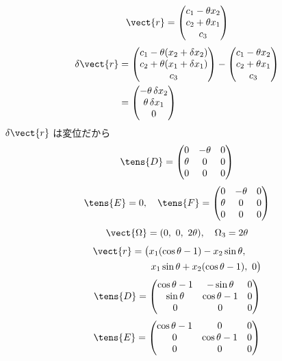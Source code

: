 \[ \vect{r}=\begin{pmatrix}c_{1}-\theta x_{2}\\c_{2}+\theta x_{1}\\c_{3}\end{pmatrix} \]
\begin{align*}
\delta\vect{r}&=\begin{pmatrix}c_{1}-\theta(x_{2}+\delta x_{2})\\c_{2}+\theta(x_{1}+\delta x_{1})\\c_{3}\end{pmatrix}-\begin{pmatrix}c_{1}-\theta x_{2}\\c_{2}+\theta x_{1}\\c_{3}\end{pmatrix}\\
&=\begin{pmatrix}-\theta\,\delta x_{2}\\\theta\,\delta x_{1}\\0\end{pmatrix}
\end{align*}
$\delta\vect{r}$ は変位だから
\[ \tens{D}=\begin{pmatrix}0&-\theta&0\\\theta&0&0\\0&0&0\end{pmatrix} \]
\[ \tens{E}=0,\quad \tens{F}=\begin{pmatrix}0&-\theta&0\\\theta&0&0\\0&0&0\end{pmatrix} \]
\[ \vect{\Omega}=(0,\ 0,\ 2\theta),\quad \Omega_{3}=2\theta \]
\begin{align*}
\vect{r}&=\bigl(x_{1}(\cos\theta-1)-x_{2}\sin\theta,\\
&\qquad x_{1}\sin\theta+x_{2}(\cos\theta-1),\ 0\bigr)
\end{align*}
\[ \tens{D}=\begin{pmatrix}\cos\theta-1&-\sin\theta&0\\\sin\theta&\cos\theta-1&0\\0&0&0\end{pmatrix} \]
\[ \tens{E}=\begin{pmatrix}\cos\theta-1&0&0\\0&\cos\theta-1&0\\0&0&0\end{pmatrix} \]
